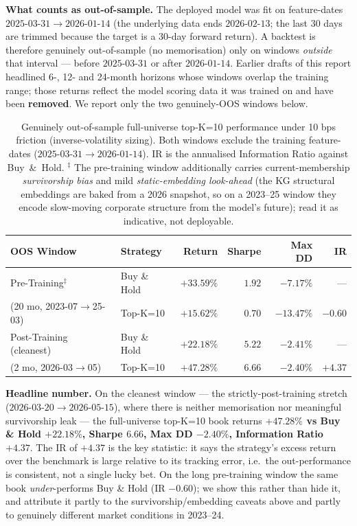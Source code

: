 \documentclass[10pt,journal,compsoc]{IEEEtran}
\begin{document}
\noindent \textbf{What counts as out-of-sample.} The deployed model was fit on feature-dates $2025\text{-}03\text{-}31 \to 2026\text{-}01\text{-}14$ (the underlying data ends $2026\text{-}02\text{-}13$; the last 30 days are trimmed because the target is a 30-day forward return). A backtest is therefore genuinely out-of-sample (no memorisation) only on windows \emph{outside} that interval --- before $2025\text{-}03\text{-}31$ or after $2026\text{-}01\text{-}14$. Earlier drafts of this report headlined 6-, 12- and 24-month horizons whose windows overlap the training range; those returns reflect the model scoring data it was trained on and have been \textbf{removed}. We report only the two genuinely-OOS windows below.

\begin{table}[htbp]
\caption{Genuinely out-of-sample full-universe top-K=10 performance under 10 bps friction (inverse-volatility sizing). Both windows exclude the training feature-dates ($2025\text{-}03\text{-}31 \to 2026\text{-}01\text{-}14$). IR is the annualised Information Ratio against Buy~\&~Hold. $^{\ddagger}$ The pre-training window additionally carries current-membership \emph{survivorship bias} and mild \emph{static-embedding look-ahead} (the KG structural embeddings are baked from a 2026 snapshot, so on a 2023--25 window they encode slow-moving corporate structure from the model's future); read it as indicative, not deployable.}
\label{tab:bt_horizons}
\centering
\small
\begin{tabular}{llrrrr}
\toprule
\textbf{OOS Window} & \textbf{Strategy} & \textbf{Return} & \textbf{Sharpe} & \textbf{Max DD} & \textbf{IR} \\
\midrule
Pre-Training$^{\ddagger}$    & Buy \& Hold      & $+33.59\%$ & $1.92$ & $-7.17\%$  & --- \\
(20 mo, 2023-07$\to$25-03)   & Top-K=10         & $+15.62\%$ & $0.70$ & $-13.47\%$ & $-0.60$ \\
\midrule
Post-Training (cleanest)     & Buy \& Hold      & $+22.18\%$ & $5.22$ & $-2.41\%$  & --- \\
(2 mo, 2026-03$\to$05)       & Top-K=10         & $\mathbf{+47.28\%}$ & $\mathbf{6.66}$ & $-2.40\%$ & $\mathbf{+4.37}$ \\
\bottomrule
\end{tabular}
\end{table}

\noindent \textbf{Headline number.} On the cleanest window --- the strictly-post-training stretch ($2026\text{-}03\text{-}20 \to 2026\text{-}05\text{-}15$), where there is neither memorisation nor meaningful survivorship leak --- the full-universe top-K=10 book returns \textbf{$+47.28\%$ vs Buy \& Hold $+22.18\%$, Sharpe $6.66$, Max DD $-2.40\%$, Information Ratio $+4.37$}. The IR of $+4.37$ is the key statistic: it says the strategy's excess return over the benchmark is large relative to its tracking error, i.e.\ the out-performance is consistent, not a single lucky bet. On the long pre-training window the same book \emph{under}-performs Buy \& Hold (IR $-0.60$); we show this rather than hide it, and attribute it partly to the survivorship/embedding caveats above and partly to genuinely different market conditions in 2023--24.
\end{document}
